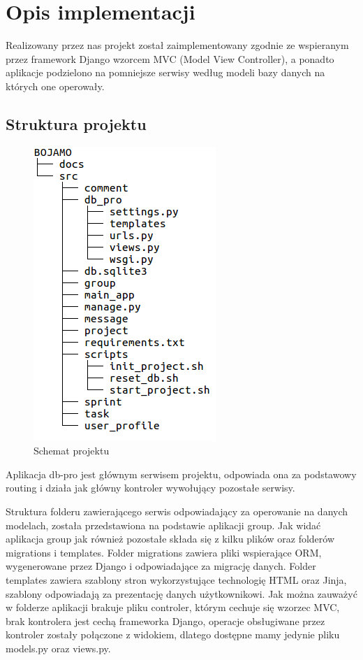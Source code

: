 \documentclass[12pt]{article}
\begin{document}
\section{Opis implementacji}
    Realizowany przez nas projekt został zaimplementowany zgodnie ze wspieranym przez framework Django wzorcem MVC (Model View Controller), a ponadto aplikacje podzielono na pomniejsze serwisy według modeli bazy danych na których one operowały.
    

\subsection{Struktura projektu}

\begin{figure}[htp]
\centering
\includegraphics[scale=0.7]{img/tree.png}
\caption{Schemat projektu}
\label{}
\end{figure}

Aplikacja db-pro jest głównym serwisem projektu, odpowiada ona za podstawowy routing i działa jak główny kontroler wywołujący pozostałe serwisy.  

Struktura folderu zawierającego serwis odpowiadający za operowanie na danych modelach, została przedstawiona na podstawie aplikacji group. Jak widać aplikacja group jak również pozostałe składa się z kilku plików oraz folderów migrations i templates. Folder migrations zawiera pliki wspierające ORM, wygenerowane przez Django i  odpowiadające za migrację danych. Folder templates zawiera szablony stron wykorzystujące technologię HTML oraz Jinja, szablony odpowiadają za prezentację danych użytkownikowi. Jak można zauważyć w folderze aplikacji brakuje pliku controler, którym cechuje się wzorzec MVC, brak kontrolera jest cechą frameworka Django, operacje obsługiwane przez kontroler zostały połączone z widokiem, dlatego dostępne mamy jedynie pliku models.py oraz views.py. 
\end{document}
